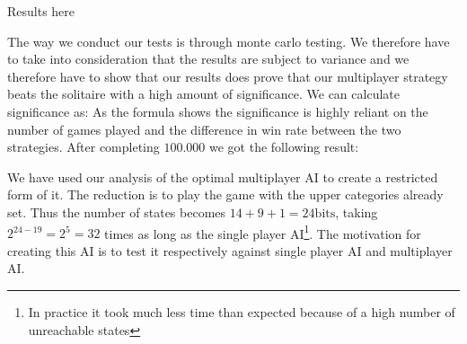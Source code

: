 Results here

The way we conduct our tests is through monte carlo testing. We therefore have to take into consideration that the results are subject to variance and we therefore have to show that our results does prove that our multiplayer strategy beats the solitaire with a high amount of significance. We can calculate significance as: %
As the formula shows the significance is highly reliant on the number of games played and the difference in win rate between the two strategies. After completing $100.000$ we got the following result: %


We have used our analysis of the optimal multiplayer AI to create a restricted form of it. The reduction is to play the game with the upper categories already set. Thus the number of states becomes $14+9+1 = 24\mbox{bits}$, taking $2^{24-19} = 2^5 = 32$ times as long as the single player AI\footnote{In practice it took much less time than expected because of a high number of unreachable states}. The motivation for creating this AI is to test it respectively against single player AI and multiplayer AI. %